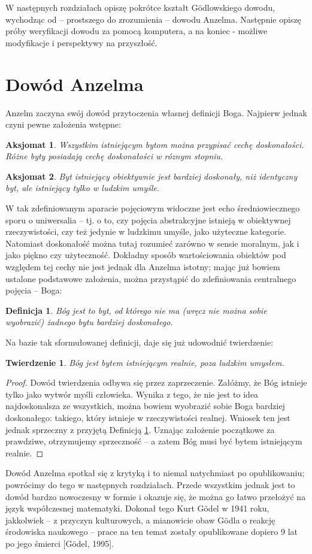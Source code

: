 \documentclass{eiti-raport}
\newtheorem{axiom}{Aksjomat}
\newtheorem{definition}{Definicja}
\newtheorem{theorem}{Twierdzenie}
\begin{document}
W następnych rozdziałach opiszę pokrótce kształt G\"odlowskiego dowodu, wychodząc od -- prostszego do zrozumienia -- dowodu Anzelma. Następnie opiszę próby weryfikacji dowodu za pomocą komputera, a na koniec - możliwe modyfikacje i perspektywy na przyszłość. 

\section{Dowód Anzelma}
Anzelm zaczyna swój dowód przytoczenia własnej definicji Boga. Najpierw jednak czyni pewne założenia wstępne: 
\begin{axiom} \label{axiom:1}
	Wszystkim istniejącym bytom można przypisać cechę \emph{doskonałości}. Różne byty posiadają cechę doskonałości w róznym stopniu. 
\end{axiom}
\begin{axiom} \label{axiom:2}
	Byt istniejący obiektywnie jest bardziej doskonały, niż identyczny byt, ale istniejący tylko w ludzkim umyśle. 
\end{axiom}
W tak zdefiniowanym aparacie pojęciowym widoczne jest echo średniowiecznego sporu o uniwersalia -- tj. o to, czy pojęcia abstrakcyjne istnieją w obiektywnej rzeczywistości, czy też jedynie w ludzkimu umyśle, jako użyteczne kategorie. Natomiast doskonałość można tutaj rozumieć zarówno w sensie moralnym, jak i jako piękno czy użyteczność. Dokładny sposób wartościowania obiektów pod względem tej cechy nie jest jednak dla Anzelma istotny; mając już bowiem ustalone podstawowe założenia, można przystąpić do zdefiniowania centralnego pojęcia -- Boga:
\begin{definition} \label{def:anzelm-god}
	Bóg jest to byt, od którego nie ma (wręcz nie można sobie wyobrazić) żadnego bytu bardziej doskonałego. 
\end{definition}
Na bazie tak sformułowanej definicji, daje się już udowodnić twierdzenie:
\begin{theorem} \label{theorem:anzelm-god}
	Bóg jest bytem istniejącym realnie, poza ludzkim umysłem. 
\end{theorem}
\begin{proof}
	Dowód twierdzenia odbywa się przez zaprzeczenie. Załóżmy, że Bóg istnieje tylko jako wytwór myśli człowieka. Wynika z tego, że nie jest to idea najdoskonalsza ze wszystkich, można bowiem wyobrazić sobie Boga bardziej doskonałego: takiego, który istnieje w rzeczywistości realnej. Wniosek ten jest jednak sprzeczny z przyjętą Definicją \ref{def:anzelm-god}. Uznając założenie początkowe za prawdziwe, otrzymujemy sprzeczność -- a zatem Bóg musi być bytem istniejącym realnie. 
\end{proof}
Dowód Anzelma spotkał się z krytyką i to niemal natychmiast po opublikowaniu; powrócimy do tego w następnych rozdziałach. Przede wszystkim jednak jest to dowód bardzo nowoczesny w formie i okazuje się, że można go łatwo przełożyć na język współczesnej matematyki. Dokonał tego Kurt G\"odel w 1941 roku, jakkolwiek -- z przyczyn kulturowych, a mianowicie obaw G\"odla o reakcję środowiska naukowego -- prace na ten temat zostały opublikowane dopiero 9 lat po jego śmierci [G\"odel, 1995]. 
\end{document}
